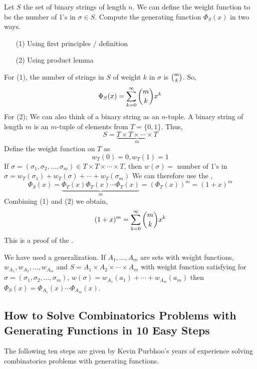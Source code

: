 \documentclass[english, 11pt]{article}
\begin{document}
   \begin{exmp}
     Let $S$ the set of binary strings of length $n$. We can define the weight function to be the number of 1's in $\sigma \in S$. Compute the generating function $\Phi_S(x)$ in two ways.
     \begin{itemize}
       \item [(1)] Using first principles / definition
       \item [(2)] Using product lemma
     \end{itemize}
     For (1), the number of strings in $S$ of weight $k$ in $\sigma$ is ${m \choose k}$. So,
     \[ \Phi_S(x) = \sum_{k=0}^{\infty} {m \choose k} x^k \]
     For (2); We can also think of a binary string as an $n$-tuple. A binary string of length $m$ is an $m$-tuple of elements from $T = \{ 0,1 \}$. Thus,
     \[ S = \underbrace{T \times T \times \cdots \times T}_m \]
     Define the weight function on $T$ as
     \[ w_T(0) = 0, w_T(1) = 1 \]
     If $\sigma = (\sigma_1, \sigma_2, \ldots, \sigma_m) \in T\times T\times \cdots \times T$, then $w(\sigma) =$ number of 1's in $\sigma = w_T(\sigma_1) + w_T(\sigma) + \cdots + w_T(\sigma_m)$
     We can therefore use the ,
     \[ \Phi_S(x) = \underbrace{\Phi_T(x)\Phi_T(x) \cdots \Phi_T(x)}_m = (\Phi_T(x))^m = (1+x)^m \]
     Combining (1) and (2) we obtain,
     \[  (1+x)^m =  \sum_{k=0}^{\infty} {m \choose k} x^k \]
     This is a proof of the .
   \end{exmp}

   \begin{note}
     We have used a generalization. If $A_1, \ldots, A_m$ are sets with weight functions, $w_{A_1}, w_{A_2}, \ldots, w_{A_m}$ and $S = A_1 \times A_2 \times \cdots \times A_m$ with weight function satisfying for $\sigma = (\sigma_1, \sigma_2, \ldots, \sigma_m)$, $w(\sigma) = w_{A_1}(a_1) + \cdots + w_{A_m}(a_m)$ then $\Phi_S(x) = \Phi_{A_1}(x) \cdots \Phi_{A_m} (x)$.
   \end{note}

  \subsection{How to Solve Combinatorics Problems with Generating Functions in 10 Easy Steps}

  The following ten steps are given by Kevin Purbhoo's years of experience solving combinatorics problems with generating functions.
\end{document}
